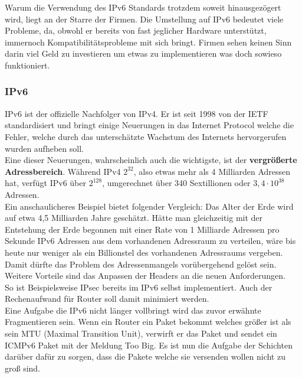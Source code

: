 \documentclass[12pt,a4paper]{report}
\begin{document}
Warum die Verwendung des IPv6 Standards trotzdem soweit hinausgezögert wird, liegt an der Starre der Firmen. Die Umstellung auf IPv6 bedeutet viele Probleme, da, obwohl er bereits von fast jeglicher Hardware unterstützt, immernoch Kompatibilitätsprobleme mit sich bringt. Firmen sehen keinen Sinn darin viel Geld zu investieren um etwas zu implementieren was doch sowieso funktioniert.\\
\subsubsection{IPv6}
IPv6 ist der offizielle Nachfolger von IPv4. Er ist seit 1998 von der IETF standardisiert und bringt einige Neuerungen in das Internet Protocol welche die Fehler, welche durch das unterschätzte Wachstum des Internets hervorgerufen wurden aufheben soll.\\

Eine dieser Neuerungen, wahrscheinlich auch die wichtigste, ist der \textbf{vergrößerte Adressbereich}. Während IPv4 $2^{32}$, also etwas mehr als 4 Milliarden Adressen hat, verfügt IPv6 über $2^{128}$, umgerechnet über 340 Sextillionen oder $3,4 \cdot 10^{38}$ Adressen.\\
Ein anschaulicheres Beispiel bietet folgender Vergleich: Das Alter der Erde wird auf etwa 4,5 Milliarden Jahre geschätzt. Hätte man gleichzeitig mit der Entstehung der Erde begonnen mit einer Rate von 1 Milliarde Adressen pro Sekunde IPv6 Adressen aus dem vorhandenen Adressraum zu verteilen, wäre bis heute nur weniger als ein Billionstel des vorhandenen Adressraums vergeben.\\
Damit dürfte das Problem des Adressenmangels vorübergehend gelöst sein.\\

Weitere Vorteile sind das Anpassen der Headers an die neuen Anforderungen.\\
So ist Beispielsweise IPsec bereits im IPv6 selbst implementiert. Auch der Rechenaufwand für Router soll damit minimiert werden.\\

Eine Aufgabe die IPv6 nicht länger vollbringt wird das zuvor erwähnte Fragmentieren sein. Wenn ein Router ein Paket bekommt welches größer ist als sein MTU (Maximal Transition Unit), verwirft er das Paket und sendet ein ICMPv6 Paket mit der Meldung \glqq Too Big\grqq . Es ist nun die Aufgabe der Schichten darüber dafür zu sorgen, dass die Pakete welche sie versenden wollen nicht zu groß sind.\\
\end{document}
